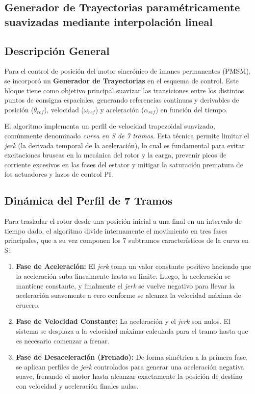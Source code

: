 \documentclass[12pt, a4paper,journal, onecolumn, compsoc]{IEEEtran}
\begin{document}
\begin{appendices}
\section{Generador de Trayectorias paramétricamente suavizadas mediante interpolación lineal}
\subsection{Descripción General}
Para el control de posición del motor sincrónico de imanes permanentes (PMSM), se incorporó un \textbf{Generador de Trayectorias} en el esquema de control. Este bloque tiene como objetivo principal suavizar las transiciones entre los distintos puntos de consigna espaciales, generando referencias continuas y derivables de posición ($\theta_{ref}$), velocidad ($\omega_{ref}$) y aceleración ($\alpha_{ref}$) en función del tiempo. 

El algoritmo implementa un perfil de velocidad trapezoidal suavizado, comúnmente denominado \textit{curva en S de 7 tramos}. Esta técnica permite limitar el \textit{jerk} (la derivada temporal de la aceleración), lo cual es fundamental para evitar excitaciones bruscas en la mecánica del rotor y la carga, prevenir picos de corriente excesivos en las fases del estator y mitigar la saturación prematura de los actuadores y lazos de control PI.

\subsection{Dinámica del Perfil de 7 Tramos}
Para trasladar el rotor desde una posición inicial a una final en un intervalo de tiempo dado, el algoritmo divide internamente el movimiento en tres fases principales, que a su vez componen los 7 subtramos característicos de la curva en S:
\begin{enumerate}
    \item \textbf{Fase de Aceleración:} El \textit{jerk} toma un valor constante positivo haciendo que la aceleración suba linealmente hasta su límite. Luego, la aceleración se mantiene constante, y finalmente el \textit{jerk} se vuelve negativo para llevar la aceleración suavemente a cero conforme se alcanza la velocidad máxima de crucero.
    \item \textbf{Fase de Velocidad Constante:} La aceleración y el \textit{jerk} son nulos. El sistema se desplaza a la velocidad máxima calculada para el tramo hasta que es necesario comenzar a frenar.
    \item \textbf{Fase de Desaceleración (Frenado):} De forma simétrica a la primera fase, se aplican perfiles de \textit{jerk} controlados para generar una aceleración negativa suave, frenando el motor hasta alcanzar exactamente la posición de destino con velocidad y aceleración finales nulas.
\end{enumerate}


\end{appendices}
\end{document}
